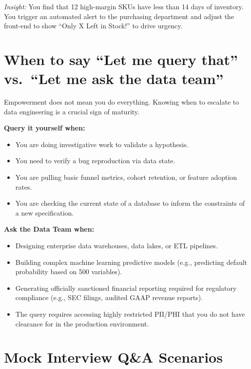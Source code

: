 \documentclass[
  11pt,
  openany,
  oneside]{book}
\providecommand{\tightlist}{%
  \setlength{\itemsep}{0pt}\setlength{\parskip}{0pt}}
\begin{document}
\emph{Insight:} You find that 12 high-margin SKUs have less than 14 days
of inventory. You trigger an automated alert to the purchasing
department and adjust the front-end to show ``Only X Left in Stock!'' to
drive urgency.

\bigskip

\section{When to say ``Let me query that'' vs.~``Let me ask the data
team''}\label{when-to-say-let-me-query-that-vs.-let-me-ask-the-data-team}

Empowerment does not mean you do everything. Knowing when to escalate to
data engineering is a crucial sign of maturity.

\textbf{Query it yourself when:}

\begin{itemize}
\tightlist
\item
  You are doing investigative work to validate a hypothesis.
\item
  You need to verify a bug reproduction via data state.
\item
  You are pulling basic funnel metrics, cohort retention, or feature
  adoption rates.
\item
  You are checking the current state of a database to inform the
  constraints of a new specification.
\end{itemize}

\textbf{Ask the Data Team when:}

\begin{itemize}
\tightlist
\item
  Designing enterprise data warehouses, data lakes, or ETL pipelines.
\item
  Building complex machine learning predictive models (e.g., predicting
  default probability based on 500 variables).
\item
  Generating officially sanctioned financial reporting required for
  regulatory compliance (e.g., SEC filings, audited GAAP revenue
  reports).
\item
  The query requires accessing highly restricted PII/PHI that you do not
  have clearance for in the production environment.
\end{itemize}

\bigskip

\section{Mock Interview Q\&A
Scenarios}\label{mock-interview-qa-scenarios}
\end{document}
